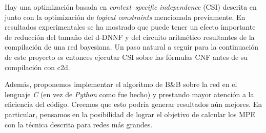 \documentclass[11pt, letterpaper]{article}
\begin{document}
Hay una optimización basada en \emph{context–specific independence} (CSI)
descrita en
\cite{Darwiche01alogical} junto con la optimización de \emph{logical constraints}
mencionada previamente. En resultados experimentales se ha mostrado que puede
tener un efecto importante de reducción del tamaño del d-DNNF y del circuito
aritmético resultantes de la compilación de una red bayesiana. Un paso natural a
seguir para la continuación de este proyecto es entonces ejecutar CSI sobre las
fórmulas CNF antes de su compilación con c2d.

Además, proponemos implementar el algoritmo de B\&B sobre la red en el
lenguaje \emph{C} (en vez de \emph{Python} como fue hecho) y prestando mayor
atención a la eficiencia del código. Creemos
que esto podría generar resultados aún mejores. En particular, pensamos en la
posibilidad de lograr el objetivo de calcular los MPE con la técnica descrita
para redes más grandes.



\end{document}
